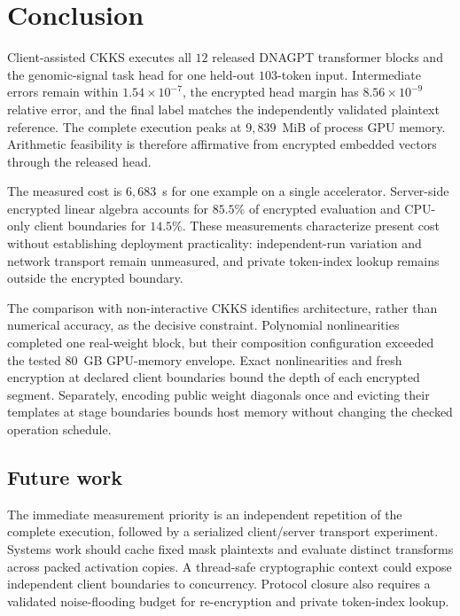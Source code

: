 
\section{Conclusion}

Client-assisted CKKS executes all $12$ released DNAGPT transformer blocks and the genomic-signal
task head for one held-out $103$-token input. Intermediate errors remain within
$1.54\times10^{-7}$, the encrypted head margin has $8.56\times10^{-9}$ relative error, and the
final label matches the independently validated plaintext reference. The complete execution peaks
at $9{,}839$~MiB of process GPU memory. Arithmetic feasibility is therefore affirmative from
encrypted embedded vectors through the released head.

The measured cost is $6{,}683$~s for one example on a single accelerator. Server-side encrypted
linear algebra accounts for $85.5\%$ of encrypted evaluation and CPU-only client boundaries for
$14.5\%$. These measurements characterize present cost without establishing deployment
practicality: independent-run variation and network transport remain unmeasured, and private
token-index lookup remains outside the encrypted boundary.

The comparison with non-interactive CKKS identifies architecture, rather than numerical accuracy,
as the decisive constraint. Polynomial nonlinearities completed one real-weight block, but their
composition configuration exceeded the tested $80$~GB GPU-memory envelope. Exact nonlinearities and
fresh encryption at declared client boundaries bound the depth of each encrypted segment.
Separately, encoding public weight diagonals once and evicting their templates at stage boundaries
bounds host memory without changing the checked operation schedule.

\subsection*{Future work}

The immediate measurement priority is an independent repetition of the complete execution, followed
by a serialized client/server transport experiment. Systems work should cache fixed mask plaintexts
and evaluate distinct transforms across packed activation copies. A thread-safe cryptographic
context could expose independent client boundaries to concurrency. Protocol closure also requires a
validated noise-flooding budget for re-encryption and private token-index lookup.
